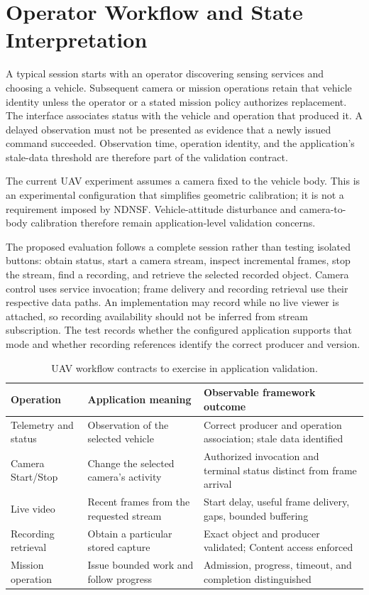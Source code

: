 \section{Operator Workflow and State Interpretation}
A typical session starts with an operator discovering sensing services and choosing a vehicle. Subsequent camera or mission operations retain that vehicle identity unless the operator or a stated mission policy authorizes replacement. The interface associates status with the vehicle and operation that produced it. A delayed observation must not be presented as evidence that a newly issued command succeeded. Observation time, operation identity, and the application's stale-data threshold are therefore part of the validation contract.

The current UAV experiment assumes a camera fixed to the vehicle body. This is an experimental configuration that simplifies geometric calibration; it is not a requirement imposed by NDNSF. Vehicle-attitude disturbance and camera-to-body calibration therefore remain application-level validation concerns.

The proposed evaluation follows a complete session rather than testing isolated buttons: obtain status, start a camera stream, inspect incremental frames, stop the stream, find a recording, and retrieve the selected recorded object. Camera control uses service invocation; frame delivery and recording retrieval use their respective data paths. An implementation may record while no live viewer is attached, so recording availability should not be inferred from stream subscription. The test records whether the configured application supports that mode and whether recording references identify the correct producer and version.

\begin{table}[htbp]\centering\small
\caption{UAV workflow contracts to exercise in application validation.}
\begin{tabularx}{\textwidth}{p{}XX}
\toprule Operation & Application meaning & Observable framework outcome\\\midrule
Telemetry and status & Observation of the selected vehicle & Correct producer and operation association; stale data identified\\\midrule
Camera Start/Stop & Change the selected camera's activity & Authorized invocation and terminal status distinct from frame arrival\\\midrule
Live video & Recent frames from the requested stream & Start delay, useful frame delivery, gaps, bounded buffering\\\midrule
Recording retrieval & Obtain a particular stored capture & Exact object and producer validated; Content access enforced\\\midrule
Mission operation & Issue bounded work and follow progress & Admission, progress, timeout, and completion distinguished\\\bottomrule
\end{tabularx}
\end{table}

